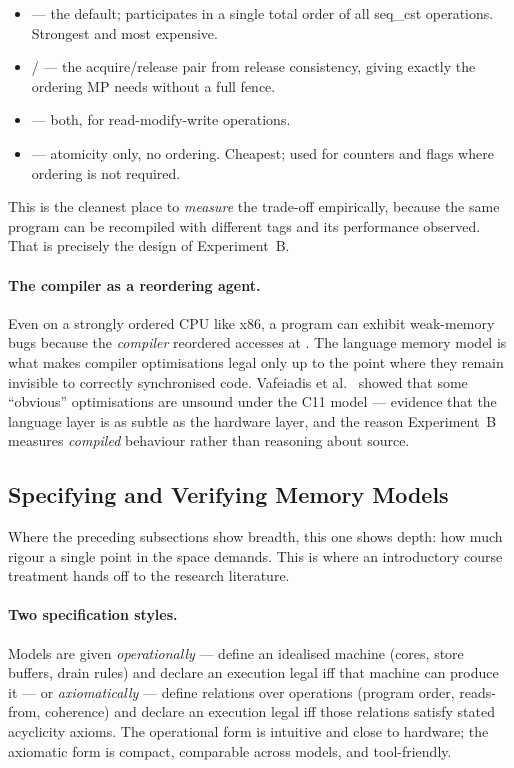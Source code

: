 \begin{itemize}[leftmargin=*,itemsep=1pt]
\item {} --- the default; participates in a single
  total order of all seq\_cst operations. Strongest and most expensive.
\item {} /  --- the
  acquire/release pair from release consistency, giving exactly the ordering MP
  needs without a full fence.
\item {} --- both, for read-modify-write operations.
\item {} --- atomicity only, no ordering. Cheapest;
  used for counters and flags where ordering is not required.
\end{itemize}

This is the cleanest place to \emph{measure} the trade-off empirically, because
the same program can be recompiled with different tags and its performance
observed.
That is precisely the design of Experiment~B.

\paragraph{The compiler as a reordering agent.}
Even on a strongly ordered CPU like x86, a program can exhibit weak-memory bugs
because the \emph{compiler} reordered accesses at .
The language memory model is what makes compiler optimisations legal only up to
the point where they remain invisible to correctly synchronised code.
Vafeiadis et al.\ \cite{vafeiadis2015common} showed that some ``obvious''
optimisations are unsound under the C11 model --- evidence that the language
layer is as subtle as the hardware layer, and the reason Experiment~B measures
\emph{compiled} behaviour rather than reasoning about source.

\subsection{Specifying and Verifying Memory Models}

Where the preceding subsections show breadth, this one shows depth: how much
rigour a single point in the space demands.
This is where an introductory course treatment hands off to the research
literature.

\paragraph{Two specification styles.}
Models are given \emph{operationally} --- define an idealised machine (cores,
store buffers, drain rules) and declare an execution legal iff that machine can
produce it --- or \emph{axiomatically} --- define relations over operations
(program order, reads-from, coherence) and declare an execution legal iff those
relations satisfy stated acyclicity axioms.
The operational form is intuitive and close to hardware; the axiomatic form is
compact, comparable across models, and tool-friendly.

